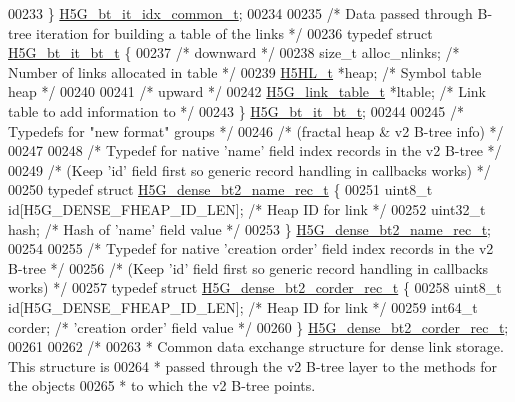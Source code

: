 \begin{DoxyCode}
00233 \} \hyperlink{struct_h5_g__bt__it__idx__common__t}{H5G\_bt\_it\_idx\_common\_t};
00234 
00235 \textcolor{comment}{/* Data passed through B-tree iteration for building a table of the links */}
00236 \textcolor{keyword}{typedef} \textcolor{keyword}{struct }\hyperlink{struct_h5_g__bt__it__bt__t}{H5G\_bt\_it\_bt\_t} \{
00237     \textcolor{comment}{/* downward */}
00238     \textcolor{keywordtype}{size\_t} alloc\_nlinks;        \textcolor{comment}{/* Number of links allocated in table */}
00239     \hyperlink{struct_h5_h_l__t}{H5HL\_t} *heap;               \textcolor{comment}{/* Symbol table heap */}
00240 
00241     \textcolor{comment}{/* upward */}
00242     \hyperlink{struct_h5_g__link__table__t}{H5G\_link\_table\_t} *ltable;   \textcolor{comment}{/* Link table to add information to */}
00243 \} \hyperlink{struct_h5_g__bt__it__bt__t}{H5G\_bt\_it\_bt\_t};
00244 
00245 \textcolor{comment}{/* Typedefs for "new format" groups */}
00246 \textcolor{comment}{/* (fractal heap & v2 B-tree info) */}
00247 
00248 \textcolor{comment}{/* Typedef for native 'name' field index records in the v2 B-tree */}
00249 \textcolor{comment}{/* (Keep 'id' field first so generic record handling in callbacks works) */}
00250 \textcolor{keyword}{typedef} \textcolor{keyword}{struct }\hyperlink{struct_h5_g__dense__bt2__name__rec__t}{H5G\_dense\_bt2\_name\_rec\_t} \{
00251     uint8\_t \textcolor{keywordtype}{id}[H5G\_DENSE\_FHEAP\_ID\_LEN]; \textcolor{comment}{/* Heap ID for link */}
00252     uint32\_t hash;                      \textcolor{comment}{/* Hash of 'name' field value */}
00253 \} \hyperlink{struct_h5_g__dense__bt2__name__rec__t}{H5G\_dense\_bt2\_name\_rec\_t};
00254 
00255 \textcolor{comment}{/* Typedef for native 'creation order' field index records in the v2 B-tree */}
00256 \textcolor{comment}{/* (Keep 'id' field first so generic record handling in callbacks works) */}
00257 \textcolor{keyword}{typedef} \textcolor{keyword}{struct }\hyperlink{struct_h5_g__dense__bt2__corder__rec__t}{H5G\_dense\_bt2\_corder\_rec\_t} \{
00258     uint8\_t \textcolor{keywordtype}{id}[H5G\_DENSE\_FHEAP\_ID\_LEN]; \textcolor{comment}{/* Heap ID for link */}
00259     int64\_t corder;                     \textcolor{comment}{/* 'creation order' field value */}
00260 \} \hyperlink{struct_h5_g__dense__bt2__corder__rec__t}{H5G\_dense\_bt2\_corder\_rec\_t};
00261 
00262 \textcolor{comment}{/*}
00263 \textcolor{comment}{ * Common data exchange structure for dense link storage.  This structure is}
00264 \textcolor{comment}{ * passed through the v2 B-tree layer to the methods for the objects}
00265 \textcolor{comment}{ * to which the v2 B-tree points.}

\end{DoxyCode}
